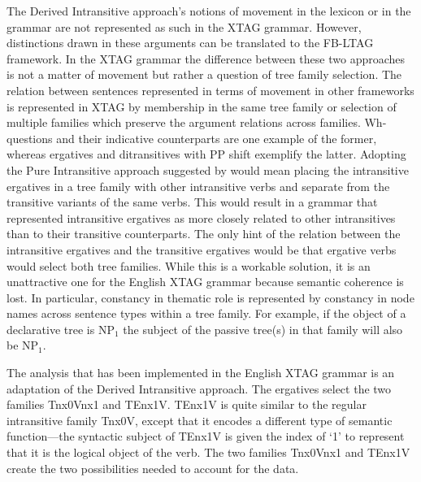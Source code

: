 The Derived Intransitive approach's notions of movement in the lexicon
or in the grammar are not represented as such in the XTAG grammar.
However, distinctions drawn in these arguments can be translated to
the FB-LTAG framework.  In the XTAG grammar the difference between
these two approaches is not a matter of movement but rather a question
of tree family selection.  The relation between sentences represented
in terms of movement in other frameworks is represented in XTAG by
membership in the same tree family or selection of multiple families
which preserve the argument relations across families. Wh-questions
and their indicative counterparts are one example of the former,
whereas ergatives and ditransitives with PP shift exemplify the
latter.  Adopting the Pure Intransitive approach suggested by
\cite{Napoli88} would mean placing the intransitive ergatives in a
tree family with other intransitive verbs and separate from the
transitive variants of the same verbs.  This would result in a grammar
that represented intransitive ergatives as more closely related to
other intransitives than to their transitive counterparts.  The only
hint of the relation between the intransitive ergatives and the
transitive ergatives would be that ergative verbs would select both
tree families. While this is a workable solution, it is an
unattractive one for the English XTAG grammar because semantic
coherence is lost.  In particular, constancy in thematic role is
represented by constancy in node names across sentence types within a
tree family. For example, if the object of a declarative tree is
NP$_{1}$ the subject of the passive tree(s) in that family will also
be NP$_{1}$.  

The analysis that has been implemented in the English XTAG grammar is
an adaptation of the Derived Intransitive approach.  The ergatives
select the two families Tnx0Vnx1 and TEnx1V.  TEnx1V is quite similar
to the regular intransitive family Tnx0V, except that it encodes a
different type of semantic function---the syntactic subject of TEnx1V
is given the index of `1' to represent that it is the logical object
of the verb.  The two families Tnx0Vnx1 and TEnx1V create the two
possibilities needed to account for the data.

